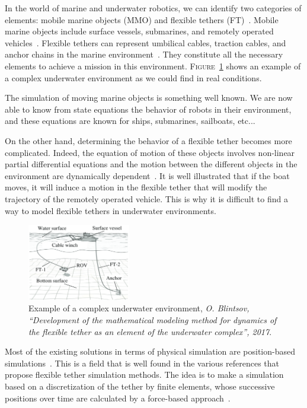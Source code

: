 In the world of marine and underwater robotics, we can identify two categories of elements: mobile marine objects (MMO) and flexible tethers (FT)~\cite{blintsov_development_2017}. Mobile marine objects include surface vessels, submarines, and remotely operated vehicles~\cite{fossen2011handbook}. Flexible tethers can represent umbilical cables, traction cables, and anchor chains in the marine environment~\cite{fossen2011handbook}. They constitute all the necessary elements to achieve a mission in this environment. \textsc{Figure}~\ref{fig:underwater_environment} shows an example of a complex underwater environment as we could find in real conditions.

The simulation of moving marine objects is something well known. We are now able to know from state equations the behavior of robots in their environment, and these equations are known for ships, submarines, sailboats, etc...~\cite{fossen2011handbook, jaulin2019mobile}

On the other hand, determining the behavior of a flexible tether becomes more complicated. Indeed, the equation of motion of these objects involves non-linear partial differential equations and the motion between the different objects in the environment are dynamically dependent~\cite{blintsov_development_2017}. It is well illustrated that if the boat moves, it will induce a motion in the flexible tether that will modify the trajectory of the remotely operated vehicle. This is why it is difficult to find a way to model flexible tethers in underwater environments.

\begin{figure}[!htb]
	\centering
	\includegraphics[width=0.4\textwidth]{imgs/underwater_environment.png}
	\caption{Example of a complex underwater environment, \textit{O.  Blintsov,  “Development  of  the  mathematical  modeling  method  for dynamics of the flexible tether as an element of the underwater complex”, 2017}.~\cite{blintsov_development_2017}}
	\label{fig:underwater_environment}
\end{figure}

Most of the existing solutions in terms of physical simulation are position-based simulations~\cite{bender_simulation_methods}. This is a field that is well found in the various references that propose flexible tether simulation methods. The idea is to make a simulation based on a discretization of the tether by finite elements, whose successive positions over time are calculated by a force-based approach~\cite{blintsov_development_2017,marshall,ganoni_unreal, koenemann_modeling_2017, prabhakar_dynamics_2005}.

